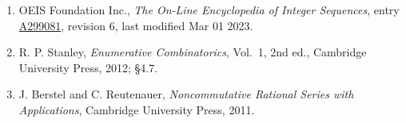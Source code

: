 \documentclass[11pt]{article}
\theoremstyle{definition}
\begin{document}
\begin{enumerate}

\item OEIS Foundation Inc., \emph{The On-Line Encyclopedia of Integer Sequences}, entry \href{https://oeis.org/A299081}{A299081}, revision 6, last modified Mar 01 2023.

\item R. P. Stanley, \emph{Enumerative Combinatorics}, Vol.~1, 2nd ed., Cambridge University Press, 2012; \S4.7.

\item J. Berstel and C. Reutenauer, \emph{Noncommutative Rational Series with Applications}, Cambridge University Press, 2011.

\end{enumerate}
\end{document}
